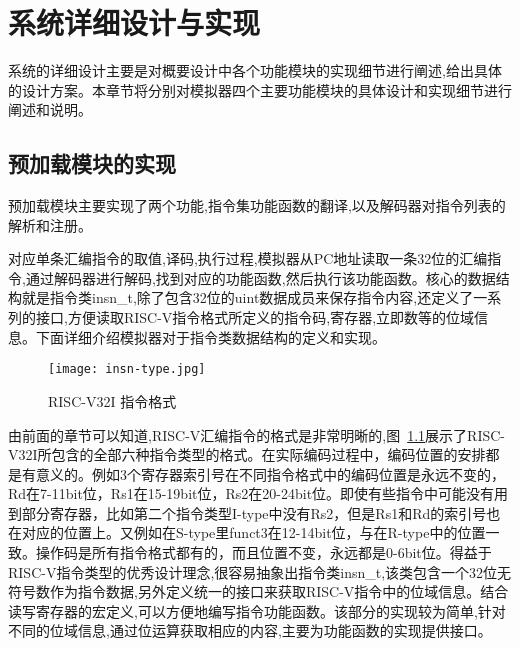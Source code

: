 
\chapter{系统详细设计与实现}

系统的详细设计主要是对概要设计中各个功能模块的实现细节进行阐述,给出具体的设计方案。本章节将分别对模拟器四个主要功能模块的具体设计和实现细节进行阐述和说明。

\section{预加载模块的实现}

预加载模块主要实现了两个功能,指令集功能函数的翻译,以及解码器对指令列表的解析和注册。

对应单条汇编指令的取值,译码,执行过程,模拟器从PC地址读取一条32位的汇编指令,通过解码器进行解码,找到对应的功能函数,然后执行该功能函数。核心的数据结构就是指令类insn\_t,除了包含32位的uint数据成员来保存指令内容,还定义了一系列的接口,方便读取RISC-V指令格式所定义的指令码,寄存器,立即数等的位域信息。下面详细介绍模拟器对于指令类数据结构的定义和实现。
\begin{figure}[h]
    \centering
    \texttt{[image: insn-type.jpg]}
    \caption{RISC-V32I 指令格式}
    \label{fig:insn-type}
\end{figure}


由前面的章节可以知道,RISC-V汇编指令的格式是非常明晰的,图~\ref{fig:insn-type}展示了RISC-V32I所包含的全部六种指令类型的格式。在实际编码过程中，编码位置的安排都是有意义的。例如3个寄存器索引号在不同指令格式中的编码位置是永远不变的，Rd在7-11bit位，Rs1在15-19bit位，Rs2在20-24bit位。即使有些指令中可能没有用到部分寄存器，比如第二个指令类型I-type中没有Rs2，但是Rs1和Rd的索引号也在对应的位置上。又例如在S-type里funct3在12-14bit位，与在R-type中的位置一致。操作码是所有指令格式都有的，而且位置不变，永远都是0-6bit位。得益于RISC-V指令类型的优秀设计理念,很容易抽象出指令类insn\_t,该类包含一个32位无符号数作为指令数据,另外定义统一的接口来获取RISC-V指令中的位域信息。结合读写寄存器的宏定义,可以方便地编写指令功能函数。该部分的实现较为简单,针对不同的位域信息,通过位运算获取相应的内容,主要为功能函数的实现提供接口。


